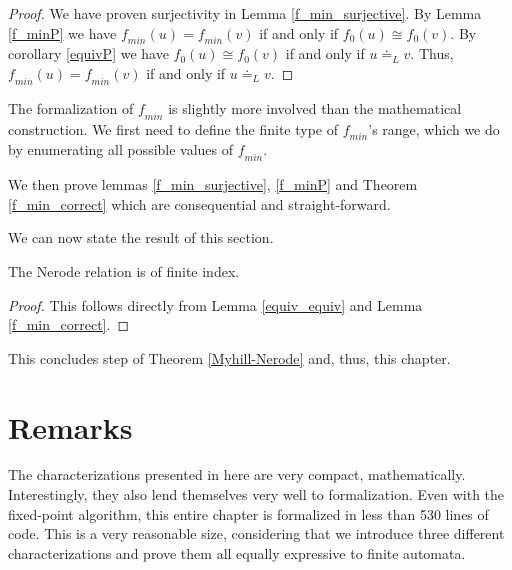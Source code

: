 \begin{proof}
    We have proven surjectivity in Lemma \ref{f_min_surjective}. 
    By Lemma \ref{f_minP} we have $\mathit{f_{min}}(u) = \mathit{f_{min}}(v)$ if and only if ${f_0}(u) \cong {f_0}(v)$.
    By corollary \ref{equivP} we have ${f_0}(u) \cong {f_0}(v)$ if and only if $u \doteq_L v$.
    Thus, $\mathit{f_{min}}(u) = \mathit{f_{min}}(v)$ if and only if $u \doteq_L v$.
\end{proof}


The formalization of $\mathit{f_{min}}$ is slightly more involved than the mathematical construction. 
We first need to define the finite type of $\mathit{f_{min}}$'s range, 
which we do by enumerating all possible values of $\mathit{f_{min}}$.



We then prove lemmas \ref{f_min_surjective}, \ref{f_minP} and Theorem \ref{f_min_correct} which are consequential and straight-forward.



We can now state the result of this section.

\begin{theorem}
    \label{weak_nerode_to_nerode}
    The Nerode relation is of finite index.
\end{theorem}
\begin{proof}
    This follows directly from Lemma \ref{equiv_equiv} and Lemma \ref{f_min_correct}.
\end{proof}



This concludes step  of Theorem \ref{Myhill-Nerode} and, thus, this chapter. 

\section*{Remarks}
The characterizations presented in here are very compact, mathematically.
Interestingly, they also lend themselves very well to formalization.
Even with the fixed-point algorithm, this entire chapter is formalized in less than 530 lines of code.
This is a very reasonable size, considering that we introduce three different characterizations 
and prove them all equally expressive to finite automata.


